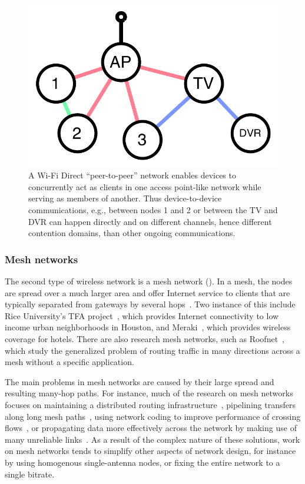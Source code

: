 \begin{figure}[thp]
      \centering
      \includegraphics[width=0.8\columnwidth]{figures/omni/p2p.pdf}
      \caption{\label{fig:wifi_p2p} A Wi-Fi Direct ``peer-to-peer'' network enables devices to concurrently act as clients in one access point-like network while serving as members of another. Thus device-to-device communications, e.g., between nodes 1 and 2 or between the TV and DVR can happen directly and on different channels, hence different contention domains, than other ongoing communications.}
\end{figure}
\subsubsection{Mesh networks}
The second type of wireless network is a mesh network (). In a mesh, the nodes are spread over a much larger area and offer Internet service to clients that are typically separated from gateways by several hops~\cite{whitehead_mesh}. Two instance of this include Rice University's TFA project~\cite{camp_tfa,rice_tfa}, which provides Internet connectivity to low income urban neighborhoods in Houston, and Meraki~\cite{meraki}, which provides wireless coverage for hotels. There are also research mesh networks, such as Roofnet~\cite{bicket_roofnet}, which study the generalized problem of routing traffic in many directions across a mesh without a specific application.

The main problems in mesh networks are caused by their large spread and resulting many-hop paths. For instance, much of the research on mesh networks focuses on maintaining a distributed routing infrastructure~\cite{stuff}, pipelining transfers along long mesh paths~\cite{li_blockswitched,li_mesh,rodrig_thesis}, using network coding to improve performance of crossing flows~\cite{katti_xors,katti_anc}, or propagating data more effectively across the network by making use of many unreliable links~\cite{biswas_exor}. As a result of the complex nature of these solutions, work on mesh networks tends to simplify other aspects of network design, for instance by using homogenous single-antenna nodes, or fixing the entire network to a single bitrate.

